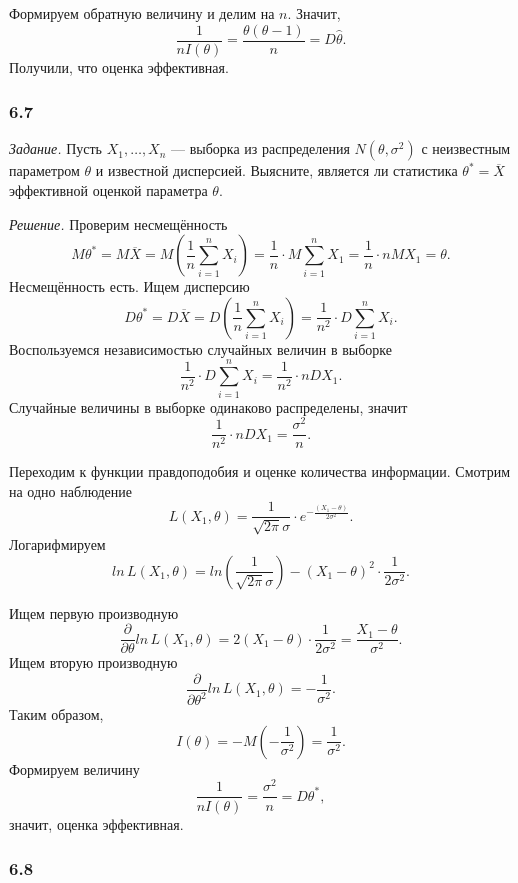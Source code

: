Формируем обратную величину и делим на $n$.
Значит,
$$ \frac{1}{nI \left( \theta \right) } =
  \frac{ \theta \left( \theta - 1 \right) }{n} =
  D \hat{ \theta }.$$
Получили, что оценка эффективная.

\subsubsection*{6.7}

\textit{Задание.}
Пусть $X_1, \dotsc, X_n$ ---
выборка из распределения $N \left( \theta, \sigma^2 \right) $ с неизвестным параметром $ \theta $
и известной дисперсией.
Выясните,
является ли статистика $ \theta^* = \overline{X}$ эффективной оценкой параметра $ \theta $.

\textit{Решение.} Проверим несмещённость
$$M \theta^* =
  M \overline{X} =
  M \left( \frac{1}{n} \sum \limits_{i = 1}^n X_i \right) =
  \frac{1}{n} \cdot M \sum \limits_{i = 1}^n X_1 =
  \frac{1}{n} \cdot nMX_1 =
  \theta.$$
Несмещённость есть.
Ищем дисперсию
$$D \theta^* =
  D \overline{X} =
  D \left( \frac{1}{n} \sum \limits_{i = 1}^n X_i \right) =
  \frac{1}{n^2} \cdot D \sum \limits_{i = 1}^n X_i.$$
Воспользуемся независимостью случайных величин в выборке
$$ \frac{1}{n^2} \cdot D \sum \limits_{i = 1}^n X_i =
  \frac{1}{n^2} \cdot nDX_1.$$
Случайные величины в выборке одинаково распределены, значит
$$ \frac{1}{n^2} \cdot nDX_1 =
  \frac{ \sigma^2}{n}.$$

Переходим к функции правдоподобия и оценке количества информации.
Смотрим на одно наблюдение
$$L \left( X_1, \theta \right) =
  \frac{1}{ \sqrt{2 \pi } \sigma } \cdot e^{- \frac{ \left( X_1 - \theta \right) }{2 \sigma^2}}.$$
Логарифмируем
$$ln \, L \left( X_1, \theta \right) =
  ln \left( \frac{1}{ \sqrt{2 \pi } \sigma } \right) -
  \left( X_1 - \theta \right)^2 \cdot \frac{1}{2 \sigma^2}.$$

Ищем первую производную
$$ \frac{ \partial }{ \partial \theta } ln \, L \left( X_1, \theta \right) =
  2 \left( X_1 - \theta \right) \cdot \frac{1}{2 \sigma^2} =
  \frac{X_1 - \theta }{ \sigma^2}.$$
Ищем вторую производную
$$ \frac{ \partial }{ \partial \theta^2} ln \, L \left( X_1, \theta \right) =
  - \frac{1}{ \sigma^2}.$$
Таким образом,
$$I \left( \theta \right) =
  -M \left( - \frac{1}{ \sigma^2} \right) =
  \frac{1}{ \sigma^2}.$$
Формируем величину
$$ \frac{1}{nI \left( \theta \right) } =
  \frac{ \sigma^2}{n} =
  D \theta^*,$$
значит, оценка эффективная.

\subsubsection*{6.8}

